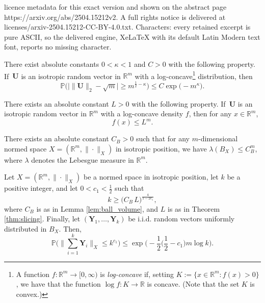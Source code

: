 \documentclass[10pt,a4paper]{amsart}
\begin{document}
licence metadata for this exact version and shown on the abstract page https://arxiv.org/abs/2504.15212v2. A full rights notice is delivered at licenses/arxiv-2504.15212-CC-BY-4.0.txt. Characters: every retained excerpt is pure ASCII, so the delivered engine, XeLaTeX with its default Latin Modern text font, reports no missing character.
\begin{theorem} \label{thm:thinshell}
There exist absolute constants $0<\kappa <1$ and $C>0$ with the following property. If\, $\mathbf{U}$ is an isotropic random vector in $\mathbb{R}^m$ with a log-concave\footnote{A function $f\colon \mathbb{R}^m\to [0,\infty)$ is \emph{log-concave} if, setting $K:=\{x\in\mathbb{R}^m\colon f(x) > 0\}$, we have that the function $\log f\colon K\to\mathbb{R}$ is concave. (Note that the set $K$ is convex.)} distribution, then
\begin{equation} \label{eq2.2}
\mathbb{P}\Big(\big|\|\mathbf{U}\|_2 - \sqrt{m}\big|  \geqslant m^{\frac12 - \kappa} \Big) \leqslant C \exp\big(-m^{\kappa}\big).
\end{equation}
\end{theorem}

\begin{theorem} \label{thm:slicing}
There exists an absolute constant $L>0$ with the following property. If\, $\mathbf{U}$ is an isotropic random vector in $\mathbb{R}^m$ with a log-concave density $f$, then for any $x \in \mathbb{R}^m$,
\begin{equation} \label{eq2.3}
f(x) \leqslant L^{m}.
\end{equation}
\end{theorem}

\begin{lemma} \label{lem:ball_volume}
There exists an absolute constant $C_B>0$ such that for any $m$-dimensional normed space $X=(\mathbb{R}^m,\|\cdot\|_X)$ in isotropic position, we have $\lambda(B_X)\leqslant C_B^m$, where $\lambda$ denotes the Lebesgue measure in $\mathbb{R}^m$.
\end{lemma}

\begin{lemma} \label{lem:prob_bound_1}
Let $X=(\mathbb{R}^m,\|\cdot\|_X)$ be a normed space in isotropic position, let $k$ be a positive integer, and let $0<c_1<\frac{1}{2}$ such that
\begin{equation} \label{eq:004}
k\geqslant \big(C_B\,L\big)^{\frac{4}{1-2c_1}},
\end{equation}
where $C_B$ is as in Lemma \ref{lem:ball_volume}, and $L$ is as in Theorem \ref{thm:slicing}. Finally, let $(\mathbf{Y}_1,\dots,\mathbf{Y}_k)$ be i.i.d. random vectors uniformly distributed in $B_X$. Then,
\begin{equation} \label{eq3.1}
\mathbb{P} \Bigg( \Big\|  \sum_{i=1}^{k} \mathbf{Y}_i \Big\|_X \leqslant k^{c_1} \Bigg)
\leqslant \exp\Big(-\frac{1}{2} \Big(\frac{1}{2}-c_1\Big) m \log k \Bigg).
\end{equation}
\end{lemma}
\end{document}
